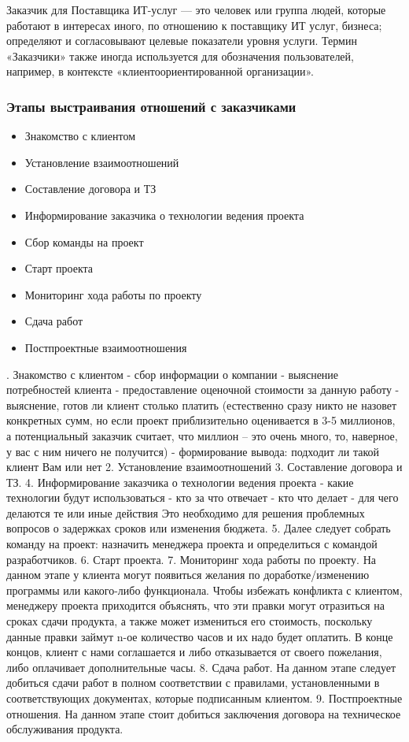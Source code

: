 \documentclass{../industrial-development}
\begin{document}
\lecturenotes
Заказчик для Поставщика ИТ-услуг — это человек или группа людей, которые работают в интересах иного, по отношению к поставщику ИТ услуг, бизнеса; определяют и согласовывают целевые показатели уровня услуги. Термин «Заказчики» также иногда используется для обозначения пользователей, например, в контексте «клиентоориентированной организации».


\begin{frame} \frametitle{Этапы выстраивания отношений с заказчиками}

\begin{itemize}
 \item Знакомство с клиентом
 \item Установление взаимоотношений
 \item Составление договора и ТЗ
 \item Информирование заказчика о технологии ведения проекта
 \item Сбор команды на проект 
 \item Старт проекта 
 \item Мониторинг хода работы по проекту
 \item Сдача работ
 \item Постпроектные взаимоотношения
  \end{itemize}
\end{frame}

. Знакомство с клиентом
  - сбор информации о компании
  -  выяснение потребностей клиента
  - предоставление оценочной стоимости за данную работу
 -  выяснение, готов ли клиент столько платить (естественно сразу никто не назовет конкретных сумм, но если проект приблизительно оценивается в 3-5 миллионов, а потенциальный заказчик считает, что миллион –  это очень много, то, наверное, у вас с ним ничего не получится)
  - формирование вывода: подходит ли такой клиент Вам или нет
2. Установление взаимоотношений
3. Составление договора и ТЗ.
4. Информирование заказчика о технологии ведения проекта
 - какие технологии будут использоваться
 - кто за что отвечает
 - кто что делает
 - для чего делаются те или иные действия
 Это необходимо для решения проблемных вопросов о задержках сроков или изменения бюджета.
5. Далее следует собрать команду на проект: назначить менеджера проекта и определиться с командой разработчиков.
6. Старт проекта.
7. Мониторинг хода работы по проекту. 
На данном этапе у клиента могут появиться желания по доработке/изменению программы или какого-либо функционала. Чтобы избежать конфликта с клиентом, менеджеру проекта приходится объяснять, что эти правки могут отразиться на сроках сдачи продукта, а также может измениться его стоимость, поскольку данные правки займут n-ое количество часов и их надо будет оплатить. В конце концов, клиент с нами соглашается и либо отказывается от своего пожелания, либо оплачивает дополнительные часы. 
8. Сдача работ.
На данном этапе следует добиться сдачи работ в полном соответствии с правилами, установленными в соответствующих документах, которые подписанным клиентом.
9. Постпроектные отношения. 
На данном этапе стоит добиться заключения договора на техническое обслуживания продукта.
\end{document}

